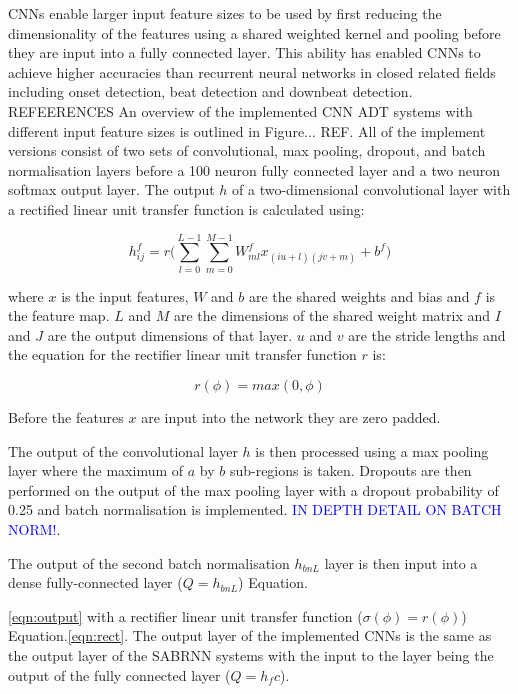 \documentclass{article}
\newcommand{\carl}[1]{\textcolor{blue}{#1}}
\begin{document}
{%
CNNs enable larger input feature sizes to be used by first reducing the dimensionality of the features using a shared weighted kernel and pooling before they are input into a fully connected layer. This ability has enabled CNNs to achieve higher accuracies than recurrent neural networks in closed related fields including onset detection, beat detection and downbeat detection. REFEERENCES  An overview of the implemented CNN ADT systems with different input feature sizes is outlined in Figure... REF. All of the implement versions consist of two sets of convolutional, max pooling, dropout, and batch normalisation layers before a 100 neuron fully connected layer and a two neuron softmax output layer. The output $h$ of a two-dimensional convolutional layer with a rectified linear unit transfer function is calculated using:

\begin{equation}\label{eqn:conv}
 h^f_{ij}=r\Bigg(\sum_{l=0}^{L-1}\sum_{m=0}^{M-1} W^f_{ml}x_{(iu+l)(jv+m)}+b^f\Bigg)
\end{equation}

where $x$ is the input features, $W$ and $b$ are the shared weights and bias and $f$ is the feature map. $L$ and $M$ are the dimensions of the shared weight matrix and $I$ and $J$ are the output dimensions of that layer. $u$ and $v$ are the stride lengths and the equation for the rectifier linear unit transfer function $r$ is:

\begin{equation}\label{eqn:rect}
r(\phi)=max(0,\phi)
\end{equation}

Before the features $x$ are input into the network they are zero padded.

The output of the convolutional layer $h$ is then processed using a max pooling layer where the maximum of $a$ by $b$ sub-regions is taken. Dropouts are then performed on the output of the max pooling layer with a dropout probability of 0.25 and batch normalisation is implemented. \carl{IN DEPTH DETAIL ON BATCH NORM!}.

The output of the second batch normalisation $h_{bnL}$ layer is then input into a dense fully-connected layer ($Q=h_{bnL}$) Equation.{\ref{eqn:output} with a rectifier linear unit transfer function ($\sigma(\phi)=r(\phi)$) Equation.\ref{eqn:rect}. The output layer of the implemented CNNs is the same as the output layer of the SABRNN systems with the input to the layer being the output of the fully connected layer ($Q=h_fc$).


}}
\end{document}
